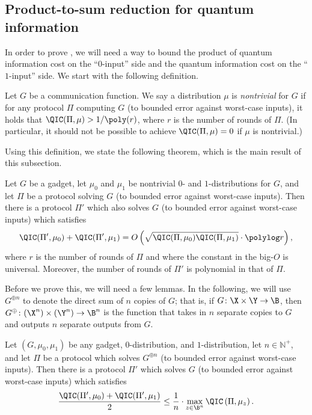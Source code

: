 \subsection{Product-to-sum reduction for quantum information}
\label{sec:am_gm}

In order to prove ,
we will need a way to bound the
product of quantum information cost on the ``$0$-input'' side
and the quantum information cost on the ``$1$-input'' side.
We start with the following definition.

\begin{definition}
Let $G$ be a communication function. We say a distribution $\mu$
is \emph{nontrivial} for $G$ if for any protocol $\Pi$
computing $G$ (to bounded error against worst-case inputs),
it holds that $\QIC(\Pi,\mu)>1/\poly(r)$, where $r$ is the number
of rounds of $\Pi$.
(In particular, it should not be possible to achieve
$\QIC(\Pi,\mu)=0$ if $\mu$ is nontrivial.)
\end{definition}

Using this definition, we state the following theorem,
which is the main result of this subsection.

\begin{theorem}\label{thm:am_gm}
Let $G$ be a gadget, let $\mu_0$ and $\mu_1$
be nontrivial $0$- and $1$-distributions for $G$,
and let $\Pi$ be a protocol
solving $G$ (to bounded error against worst-case inputs).
Then there is a protocol $\Pi'$ which also solves $G$
(to bounded error against worst-case inputs) which satisfies
\[\QIC(\Pi',\mu_0)+\QIC(\Pi',\mu_1)
=O\left(\sqrt{\QIC(\Pi,\mu_0)\QIC(\Pi,\mu_1)}\cdot \polylog r\right),\]
where $r$ is the number of rounds of $\Pi$ and
where the constant in the big-$O$ is universal.
Moreover, the number of rounds of $\Pi'$ is polynomial in that
of $\Pi$.
\end{theorem}

Before we prove this, we will need a few lemmas.
In the following, we will use $G^{\oplus n}$ to denote the
direct sum of $n$ copies of $G$; that is, if $G\colon\X\times\Y\to\B$,
then $G^{\oplus}\colon(\X^n)\times(\Y^n)\to\B^n$ is the function
that takes in $n$ separate copies to $G$ and outputs $n$
separate outputs from $G$.

\begin{lemma}\label{lem:dir_sum}
Let $(G,\mu_0,\mu_1)$ be any gadget, $0$-distribution,
and $1$-distribution, let $n\in\mathbb{N}^+$, and
let $\Pi$ be a protocol which solves $G^{\oplus n}$
(to bounded error against worst-case inputs). Then
there is a protocol $\Pi'$ which solves $G$
(to bounded error against worst-case inputs) which satisfies
\[\frac{\QIC(\Pi',\mu_0)+\QIC(\Pi',\mu_1)}{2}
\le \frac{1}{n}\cdot \max_{z\in\B^n}
\QIC\left(\Pi,\mu_z\right).\]
\end{lemma}

